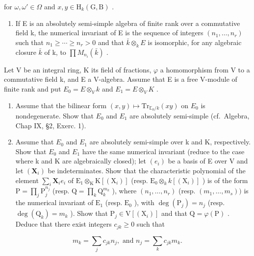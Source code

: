 for \(\omega, \omega' \in \Omega\) and \(x, y \in \mathrm{H}_k(\mathrm{G}, \mathrm{B})\) .

\begin{enumerate}
\def\labelenumi{\arabic{enumi})}
\setcounter{enumi}{25}
\tightlist
\item
  If E is an absolutely semi-simple algebra of finite rank over a commutative field k, the numerical invariant of E is the sequence of integers \((n_{1},\ldots,n_{r})\) such that \(n_{1}\geqslant\cdots\geqslant n_{r}>0\) and that \(\bar{k}\otimes_{k}E\) is isomorphic, for any algebraic closure \(\bar{k}\) of k, to \(\prod M_{n_{i}}(\bar{k})\) .
\end{enumerate}

Let V be an integral ring, K its field of fractions, \(\varphi\) a homomorphism from V to a commutative field k, and E a V-algebra. Assume that E is a free V-module of finite rank and put \(E_{0} = E \otimes_{V} k\) and \(E_{1} = E \otimes_{V} K\) .

\begin{enumerate}
\def\labelenumi{\alph{enumi})}
\item
  Assume that the bilinear form \((x,y)\mapsto\mathrm{Tr}_{\mathbb{E}_{0}/k}(xy)\) on \(E_{0}\) is nondegenerate. Show that \(E_{0}\) and \(E_{1}\) are absolutely semi-simple (cf.~Algebra, Chap IX, §2, Exerc. 1).
\item
  Assume that \(E_{0}\) and \(E_{1}\) are absolutely semi-simple over k and K, respectively. Show that \(E_{0}\) and \(E_{1}\) have the same numerical invariant (reduce to the case where k and K are algebraically closed); let \((e_{i})\) be a basis of E over V and let \((\mathbf{X}_i)\) be indeterminates. Show that the characteristic polynomial of the element \(\sum_{i}\mathbf{X}_{i}e_{i}\) of \(\mathrm{E}_1\otimes_{\mathrm{K}}\mathrm{K}[(\mathrm{X}_i)]\) (resp. \(\mathrm{E}_0\otimes_kk[(\mathrm{X}_i)]\) ) is of the form \(\mathrm{P} = \prod_j\mathrm{P}_j^{n_j}\) (resp. \(\mathrm{Q} = \prod_k\mathrm{Q}_k^{m_k}\) ), where \((n_1,\ldots ,n_r)\) (resp. \((m_1,\dots ,m_s))\) is the numerical invariant of \(\mathrm{E}_1\) (resp. \(\mathrm{E}_0\) ), with \(\deg (\mathrm{P}_j) = n_j\) (resp. \(\deg (\mathrm{Q}_k) = m_k\) ). Show that \(\mathrm{P}_j\in \mathrm{V}[(\mathrm{X}_i)]\) and that \(\mathrm{Q} = \varphi (\mathrm{P})\) . Deduce that there exist integers \(c_{jk}\geqslant 0\) such that
\end{enumerate}

\[
m _ {k} = \sum_ {j} c _ {j k} n _ {j}, \text { and } n _ {j} = \sum_ {k} c _ {j k} m _ {k}.
\]

